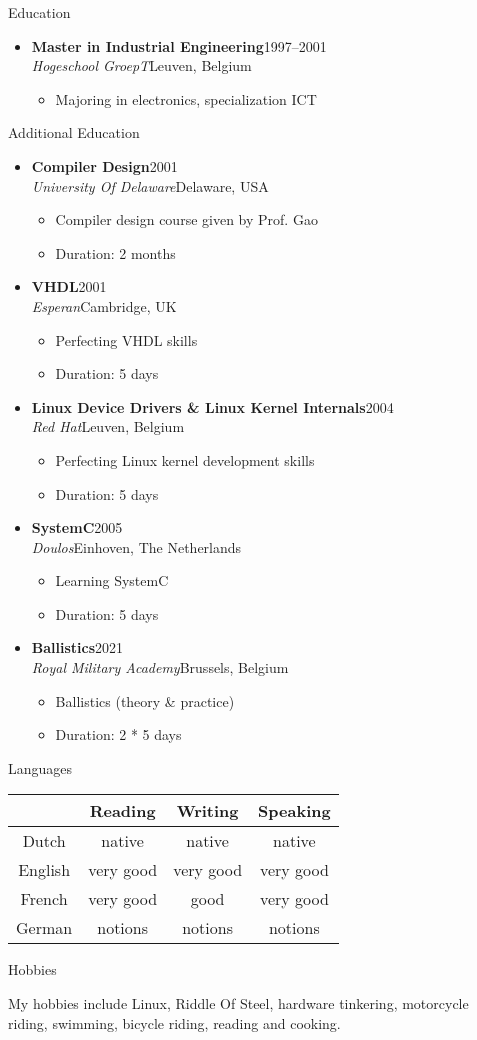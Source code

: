\documentclass[12pt,oneside]{article}
\makeatletter
\newenvironment{ressection}[1]{
	\vspace{5pt}
	{\selectfont\Large#1}
	\begin{itemize}
	\vspace{5pt}
}{
	\end{itemize}
}
\newenvironment{hobbies}{
	\vspace{5pt}
	{\selectfont\Large Hobbies}
	\vspace{5pt}
	\begin{flushleft}
}{
	\end{flushleft}
	\vspace{5pt}
}
\newcommand{\ressubitem}[1]{
	\vspace{-4pt}
	\item \begin{flushleft} #1 \end{flushleft}
}
\newcommand{\resbigitem}[4]{
	\vspace{-5pt}
	\item
	\textbf{#1}\hfill#4 \\
	\textit{#2}\hfill#3
}
\newenvironment{ressubsec}[4]{
	\resbigitem{#1}{#2}{#3}{#4}
	\vspace{-2pt}
	\begin{itemize}
}{
	\end{itemize}
}
\newcommand{\langhdr}{
& Reading & Writing & Speaking \\
}
\newcommand{\lang}[4]{
#1 & #2 & #3 & #4 \\
}
\newenvironment{languages}{
	\vspace{5pt}
	\begin{minipage}{\textwidth}
	{\selectfont\Large Languages} \\
	\begin{center}
	\begin{tabular*}{0.75\textwidth}{@{\extracolsep{\fill}}cccc}
	\langhdr
	\hline
}{
	\end{tabular*}
	\end{center}
	\end{minipage}
	\vspace{5pt}
}
\makeatother
\begin{document}
\begin{ressection}{Education}
	\begin{ressubsec}{Master in Industrial Engineering}{Hogeschool GroepT}{Leuven, Belgium}{1997--2001}
		\ressubitem{Majoring in electronics, specialization ICT}
	\end{ressubsec}
\end{ressection}

\begin{ressection}{Additional Education}
	\begin{ressubsec}{Compiler Design}{University Of Delaware}{Delaware, USA}{2001}
		\ressubitem{Compiler design course given by Prof. Gao}
		\ressubitem{Duration: 2 months}
	\end{ressubsec}
	\begin{ressubsec}{VHDL}{Esperan}{Cambridge, UK}{2001}
		\ressubitem{Perfecting VHDL skills}
		\ressubitem{Duration: 5 days}
	\end{ressubsec}
	\begin{ressubsec}{Linux Device Drivers \& Linux Kernel Internals}{Red Hat}{Leuven, Belgium}{2004}
		\ressubitem{Perfecting Linux kernel development skills}
		\ressubitem{Duration: 5 days}
	\end{ressubsec}
	\begin{ressubsec}{SystemC}{Doulos}{Einhoven, The Netherlands}{2005}
		\ressubitem{Learning SystemC}
		\ressubitem{Duration: 5 days}
	\end{ressubsec}
    \begin{ressubsec}{Ballistics}{Royal Military Academy}{Brussels, Belgium}{2021}
        \ressubitem{Ballistics (theory \& practice)}
        \ressubitem{Duration: 2 * 5 days}
   \end{ressubsec}
\end{ressection}

\begin{languages}
\lang{Dutch}{native}{native}{native}
\lang{English}{very good}{very good}{very good}
\lang{French}{very good}{good}{very good}
\lang{German}{notions}{notions}{notions}
\end{languages}

\begin{hobbies}
My hobbies include Linux, Riddle Of Steel, hardware tinkering,
motorcycle riding, swimming, bicycle riding, reading and cooking.
\end{hobbies}
\end{document}
